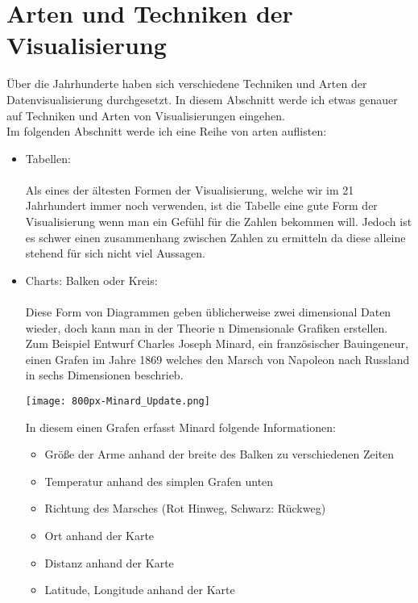 \section{Arten und Techniken der Visualisierung}
Über die Jahrhunderte haben sich verschiedene Techniken und Arten der Datenvisualisierung durchgesetzt. In diesem Abschnitt werde ich etwas
genauer auf Techniken und Arten von Visualisierungen eingehen. \\
Im folgenden Abschnitt werde ich eine Reihe von arten auflisten:
\begin{itemize}
    \item{Tabellen:} \\ \\
        Als eines der ältesten Formen der Visualisierung, welche wir im 21 Jahrhundert immer noch verwenden, ist die Tabelle eine gute Form der
        Visualisierung wenn man ein Gefühl für die Zahlen bekommen will. Jedoch ist es schwer einen zusammenhang zwischen Zahlen zu
        ermitteln da diese alleine stehend für sich nicht viel Aussagen.
    \item{Charts: Balken oder Kreis: } \\ \\
        Diese Form von Diagrammen geben üblicherweise zwei dimensional Daten wieder, doch kann man in der Theorie n Dimensionale Grafiken erstellen. Zum
        Beispiel Entwurf Charles Joseph Minard, ein französischer Bauingeneur, einen Grafen im Jahre 1869 welches den Marsch von Napoleon
        nach Russland in sechs Dimensionen beschrieb.\cite{bestvisualizations}
        \begin{center}
            \texttt{[image: 800px-Minard\_Update.png]}\cite{minardgraph}
        \end{center}
        In diesem einen Grafen erfasst Minard folgende Informationen:
        \begin{itemize}
            \item Größe der Arme anhand der breite des Balken zu verschiedenen Zeiten
            \item Temperatur anhand des simplen Grafen unten
            \item Richtung des Marsches (Rot Hinweg, Schwarz: Rückweg) 
            \item Ort anhand der Karte
            \item Distanz anhand der Karte
            \item Latitude, Longitude anhand der Karte
        \end{itemize}

\end{itemize}
